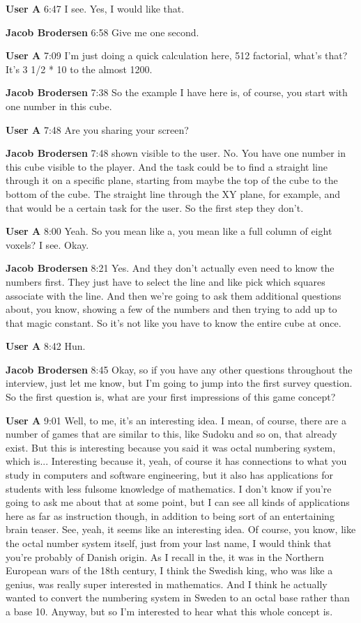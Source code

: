\documentclass{article}
\begin{document}
\noindent \textbf{User A}   6:47
I see.
Yes, I would like that.

\noindent \textbf{Jacob Brodersen}   6:58
Give me one second.

\noindent \textbf{User A}   7:09
I'm just doing a quick calculation here, 512 factorial, what's that? It's 3 1/2 * 10 to the almost 1200.

\noindent \textbf{Jacob Brodersen}   7:38
So the example I have here is, of course, you start with one number in this cube.

\noindent \textbf{User A}   7:48
Are you sharing your screen?

\noindent \textbf{Jacob Brodersen}   7:48
shown visible to the user. No.
You have one number in this cube visible to the player.
And the task could be to find a straight line through it on a specific plane, starting from maybe the top of the cube to the bottom of the cube. The straight line through the XY plane, for example, and that would be a certain task for the user. So the first step they don't.

\noindent \textbf{User A}   8:00
Yeah.
So you mean like a, you mean like a full column of eight voxels? I see. Okay.

\noindent \textbf{Jacob Brodersen}   8:21
Yes. And they don't actually even need to know the numbers first. They just have to select the line and like pick which squares associate with the line. And then we're going to ask them additional questions about, you know, showing a few of the numbers and then trying to add up to that magic constant. So it's not like you have to know the entire cube at once.

\noindent \textbf{User A}   8:42
Hun.

\noindent \textbf{Jacob Brodersen}   8:45
Okay, so if you have any other questions throughout the interview, just let me know, but I'm going to jump into the first survey question.
So the first question is, what are your first impressions of this game concept?

\noindent \textbf{User A}   9:01
Well, to me, it's an interesting idea. I mean, of course, there are a number of games that are similar to this, like Sudoku and so on, that already exist. But this is interesting because you said it was octal numbering system, which is...
Interesting because it, yeah, of course it has connections to what you study in computers and software engineering, but it also has applications for students with less fulsome knowledge of mathematics. I don't know if you're going to ask me about that at some point, but I can see all kinds of applications here as far as
instruction though, in addition to being sort of an entertaining brain teaser.
See, yeah, it seems like an interesting idea.
Of course, you know, like the octal number system itself, just from your last name, I would think that you're probably of Danish origin.
As I recall in the, it was in the Northern European wars of the 18th century, I think the Swedish king, who was like a genius, was really super interested in mathematics. And I think he actually wanted to convert the numbering system in Sweden to an octal base rather than a base 10.
Anyway, but so I'm interested to hear what this whole concept is.
\end{document}
